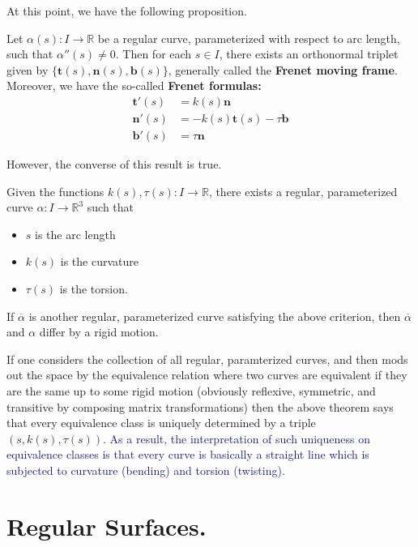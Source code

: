\documentclass[12pt,letterpaper,boxed]{maths_v5}
\newcommand{\rr}{\mathbb{R}}
\theoremstyle{definition}
\begin{document}
At this point, we have the following proposition.

\begin{prop}
    Let $\alpha(s): I \to \rr$ be a regular curve, parameterized with respect 
    to arc length, such that $\alpha''(s) \ne 0$. Then for each $s \in I$, 
    there exists an orthonormal triplet given by $\{\bm{t}(s), \bm{n}(s), \bm{b}(s)\}$, 
    generally called the \textbf{Frenet moving frame}. Moreover, we have the so-called 
    \textbf{Frenet formulas:}
    \begin{align*}
        \bm{t}'(s) &= k(s)\bm{n}\\
        \bm{n}'(s) &= -k(s)\bm{t}(s) - \tau\bm{b}\\
        \bm{b}'(s) &= \tau\bm{n}
    \end{align*}
\end{prop}

However, the converse of this result is true. 

\begin{thm}
    Given the functions $k(s), \tau(s): I \to \rr$, there exists a 
    regular, parameterized curve $\alpha: I \to \rr^3$ such that 
    \begin{itemize}
        \item $s$ is the arc length
        \item $k(s)$ is the curvature
        \item $\tau(s)$ is the torsion.
    \end{itemize}
    If $\overline{\alpha}$ is another regular, parameterized curve satisfying the above 
    criterion, then $\overline{\alpha}$ and $\alpha$ differ by a rigid motion.
\end{thm}
If one considers the collection of all regular, paramterized curves, and then 
mods out the space by the equivalence relation where two curves are equivalent if they 
are the same up to some rigid motion (obviously reflexive, symmetric, and transitive by composing
matrix transformations) then the above theorem says that every 
equivalence class is uniquely determined by a triple $(s, k(s), \tau(s))$. 
\textcolor{MidnightBlue}{As a result, the interpretation of such 
uniqueness on equivalence classes is that every curve is basically a straight 
line which is subjected to curvature (bending) and torsion (twisting).}


\newpage
\section{Regular Surfaces.}
\end{document}
